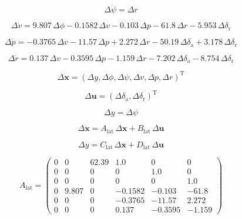 \documentclass{article}
\begin{document}
\begin{dmath}
\Delta \dot{\psi }=\Delta r
\end{dmath}

\begin{dmath}
\Delta \dot{v}=9.807\,\Delta \phi-0.1582\,\Delta v-0.103\,\Delta p -61.8\,\Delta r-5.953\,\Delta \delta _{\mathrm{r}}
\end{dmath}

\begin{dmath}
\Delta \dot{p}=-0.3765\,\Delta v-11.57\,\Delta p+2.272\,\Delta r-50.19\,\Delta \delta _{\mathrm{a}}+3.178\,\Delta \delta _{\mathrm{r}}
\end{dmath}

\begin{dmath}
\Delta \dot{r}=0.137\,\Delta v-0.3595\,\Delta p-1.159\,\Delta r-7.202\,\Delta \delta _{\mathrm{a}}-8.754\,\Delta \delta _{\mathrm{r}}
\end{dmath}

\begin{dmath}
\Delta \bm{x} = (\Delta y, \Delta \phi, \Delta \psi, \Delta v, \Delta p, \Delta r)^{\mathrm{T}}
\end{dmath}

\begin{dmath}
\Delta \bm{u} = (\Delta \delta _{\mathrm{a}}, \Delta \delta _{\mathrm{r}})^{\mathrm{T}}
\end{dmath}

\begin{dmath}
\Delta y = \Delta \psi
\end{dmath}

\begin{dmath}
\Delta \bm{\dot{x}} = A_{\mathrm{lat}}\,\Delta\bm{x} + B_{\mathrm{lat}}\,\Delta\bm{u}
\end{dmath}

\begin{dmath}
\Delta y = C_{\mathrm{lat}}\,\Delta\bm{x} + D_{\mathrm{lat}}\,\Delta\bm{u}
\end{dmath}

\begin{dmath}
A_{\mathrm{lat}}=\left(\begin{array}{cccccc} 0 & 0 & 62.39 & 1.0 & 0 & 0\\ 0 & 0 & 0 & 0 & 1.0 & 0\\ 0 & 0 & 0 & 0 & 0 & 1.0\\ 0 & 9.807 & 0 & -0.1582 & -0.103 & -61.8\\ 0 & 0 & 0 & -0.3765 & -11.57 & 2.272\\ 0 & 0 & 0 & 0.137 & -0.3595 & -1.159 \end{array}\right)
\end{dmath}
\end{document}
